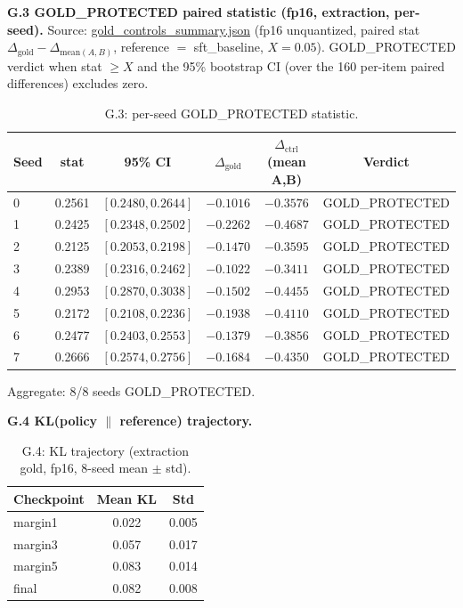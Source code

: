 \textbf{G.3 GOLD\_PROTECTED paired statistic (fp16, extraction, per-seed).} Source: \url{gold_controls_summary.json} (fp16 unquantized, paired stat $\Delta_{\text{gold}}-\Delta_{\text{mean}(A,B)}$, reference $=$ sft\_baseline, $X{=}0.05$). GOLD\_PROTECTED verdict when stat $\ge X$ and the 95\% bootstrap CI (over the 160 per-item paired differences) excludes zero.

\begin{table}[H]
\centering
\small
\caption{G.3: per-seed GOLD\_PROTECTED statistic.}
\begin{tabular}{@{}lccccc@{}}
\toprule
Seed & stat & 95\% CI & $\Delta_{\text{gold}}$ & $\Delta_{\text{ctrl}}$ (mean A,B) & Verdict\\
\midrule
0 & 0.2561 & $[0.2480,0.2644]$ & $-0.1016$ & $-0.3576$ & GOLD\_PROTECTED\\
1 & 0.2425 & $[0.2348,0.2502]$ & $-0.2262$ & $-0.4687$ & GOLD\_PROTECTED\\
2 & 0.2125 & $[0.2053,0.2198]$ & $-0.1470$ & $-0.3595$ & GOLD\_PROTECTED\\
3 & 0.2389 & $[0.2316,0.2462]$ & $-0.1022$ & $-0.3411$ & GOLD\_PROTECTED\\
4 & 0.2953 & $[0.2870,0.3038]$ & $-0.1502$ & $-0.4455$ & GOLD\_PROTECTED\\
5 & 0.2172 & $[0.2108,0.2236]$ & $-0.1938$ & $-0.4110$ & GOLD\_PROTECTED\\
6 & 0.2477 & $[0.2403,0.2553]$ & $-0.1379$ & $-0.3856$ & GOLD\_PROTECTED\\
7 & 0.2666 & $[0.2574,0.2756]$ & $-0.1684$ & $-0.4350$ & GOLD\_PROTECTED\\
\bottomrule
\end{tabular}
\end{table}

Aggregate: 8/8 seeds GOLD\_PROTECTED.

\textbf{G.4 KL(policy $\|$ reference) trajectory.}

\begin{table}[H]
\centering
\small
\caption{G.4: KL trajectory (extraction gold, fp16, 8-seed mean $\pm$ std).}
\begin{tabular}{@{}lcc@{}}
\toprule
Checkpoint & Mean KL & Std\\
\midrule
margin1 & 0.022 & 0.005\\
margin3 & 0.057 & 0.017\\
margin5 & 0.083 & 0.014\\
final & 0.082 & 0.008\\
\bottomrule
\end{tabular}
\end{table}

